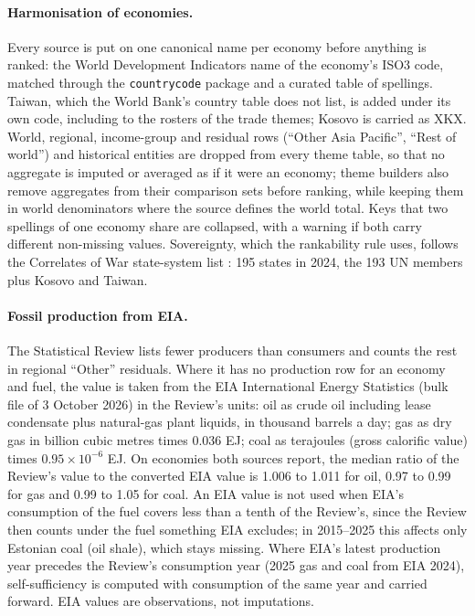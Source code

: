 \paragraph{Harmonisation of economies.} Every source is put on one canonical name per economy
before anything is ranked: the World Development Indicators name of the economy's ISO3 code,
matched through the \texttt{countrycode} package and a curated table of spellings. Taiwan, which the
World Bank's country table does not list, is added under its own code, including to the rosters of
the trade themes; Kosovo is carried as XKX. World, regional, income-group and residual rows
(``Other Asia Pacific'', ``Rest of world'') and historical entities are dropped from every theme
table, so that no aggregate is imputed or averaged as if it were an economy; theme builders also
remove aggregates from their comparison sets before ranking, while keeping them in world
denominators where the source defines the world total. Keys that two spellings of one economy
share are collapsed, with a warning if both carry different non-missing values. Sovereignty, which
the rankability rule uses, follows the Correlates of War state-system list \citep{cow2024state}:
195 states in 2024, the 193 UN members plus Kosovo and Taiwan.

\paragraph{Fossil production from EIA.} The Statistical Review lists fewer producers than consumers
and counts the rest in regional ``Other'' residuals. Where it has no production row for an economy
and fuel, the value is taken from the EIA International Energy Statistics \citep{eia2026international}
(bulk file of 3 October 2026) in the Review's units: oil as crude oil including lease condensate
plus natural-gas plant liquids, in thousand barrels a day; gas as dry gas in billion cubic metres
times 0.036 EJ; coal as terajoules (gross calorific value) times $0.95\times10^{-6}$ EJ. On economies
both sources report, the median ratio of the Review's value to the converted EIA value is 1.006 to
1.011 for oil, 0.97 to 0.99 for gas and 0.99 to 1.05 for coal. An EIA value is not used when EIA's
consumption of the fuel covers less than a tenth of the Review's, since the Review then counts under
the fuel something EIA excludes; in 2015--2025 this affects only Estonian coal (oil shale), which
stays missing. Where EIA's latest production year precedes the Review's consumption year (2025 gas
and coal from EIA 2024), self-sufficiency is computed with consumption of the same year and carried
forward. EIA values are observations, not imputations.

